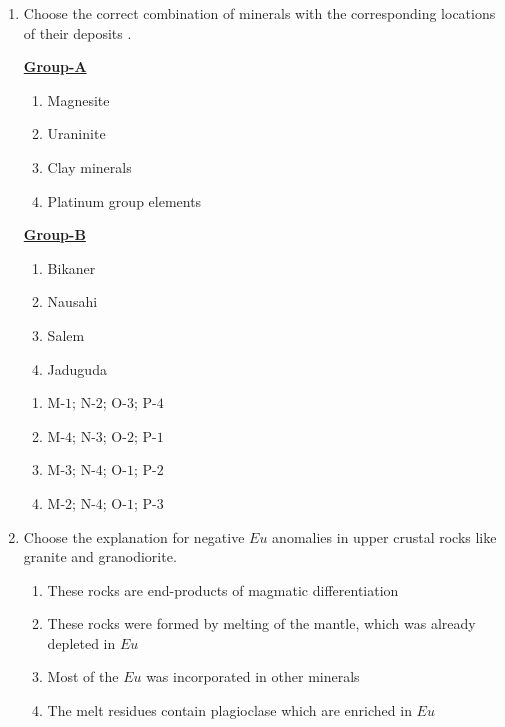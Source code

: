 \documentclass[journal,12pt,onecolumn]{IEEEtran}
\theoremstyle{remark}
\begin{document}
\begin{enumerate}
\item Choose the correct combination of minerals  with the corresponding locations of their deposits .
\begin{multicols}{2}
            \underline{\textbf{Group-A}}
            \begin{enumerate}[start =13]
                \item Magnesite
                \item Uraninite
                \item Clay minerals
                \item Platinum group elements
            \end{enumerate}

            \columnbreak

            \underline{\textbf{Group-B}}
            \begin{enumerate}
                \item Bikaner
                \item Nausahi
                \item Salem
                \item Jaduguda
            \end{enumerate}
        \end{multicols}
\hfill{}
\begin{enumerate}
    \item M-$1$; N-$2$; O-$3$; P-$4$
    \item M-$4$; N-$3$; O-$2$; P-$1$
    \item M-$3$; N-$4$; O-$1$; P-$2$
    \item M-$2$; N-$4$; O-$1$; P-$3$
\end{enumerate}

\item Choose the explanation for negative $Eu$ anomalies in upper crustal rocks like granite and granodiorite. \hfill{}
\begin{enumerate}
    \item These rocks are end-products of magmatic differentiation
    \item These rocks were formed by melting of the mantle, which was already depleted in $Eu$
    \item Most of the $Eu$ was incorporated in other minerals
    \item The melt residues contain plagioclase which are enriched in $Eu$
\end{enumerate}


\end{enumerate}
\end{document}
